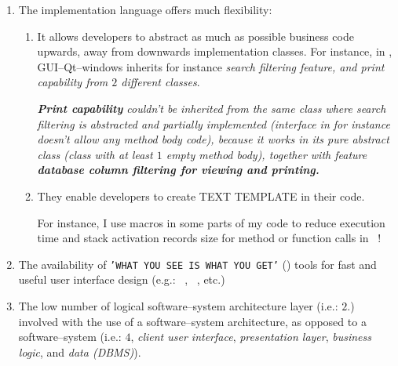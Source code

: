 \begin{enumerate}[1.]

	\item The implementation language \cplusplus
		offers much flexibility:
		
		\begin{enumerate}[1.]
			\item \emph{}
			
			It allows developers to abstract as much as possible
			business code upwards, away from downwards implementation
			classes. For instance,  in \yerotherpblack,
			GUI--Qt--windows inherits for instance
			\emph{search filtering feature, and print capability
			from $2$ different classes}.

			\emph{\textbf{Print capability} couldn't be inherited from the
			same class where search filtering is abstracted and
			partially implemented (interface in \Java for instance
			doesn't allow any method body code), because it works
			in its pure abstract class (\cplusplus class with at
			least $1$ empty method body), together with feature
			\textbf{database column filtering for viewing and printing.}}
			\newline
			
			\emph{}
			\newline
		
			\item \emph{}

			They enable developers to create TEXT TEMPLATE in their code.	
					
			For instance, I use macros in some parts of my code
			to reduce execution time and stack activation records size for
			method or function calls in \yerotherpblack\ !						
			\newline
						
		\end{enumerate}						
		
	\item The availability of \texttt{'WHAT YOU SEE IS WHAT YOU GET'}
		(\wy) tools for fast and useful
		user interface design (e.g.: \qtdesigner~\cite{qtdesigner:2020},
		\ministudio~\cite{miniStudio:2020}, etc.)
		
	\item The low number of logical software--system architecture
		layer (i.e.: $2$.) involved with the use
		of a \thickclient software--system architecture, as
		opposed to a \webbrowserbased software--system (i.e.: $4$,
		\emph{client user interface}, \emph{presentation layer},
		\emph{business logic}, and \emph{data (DBMS)}).
	
\end{enumerate}
